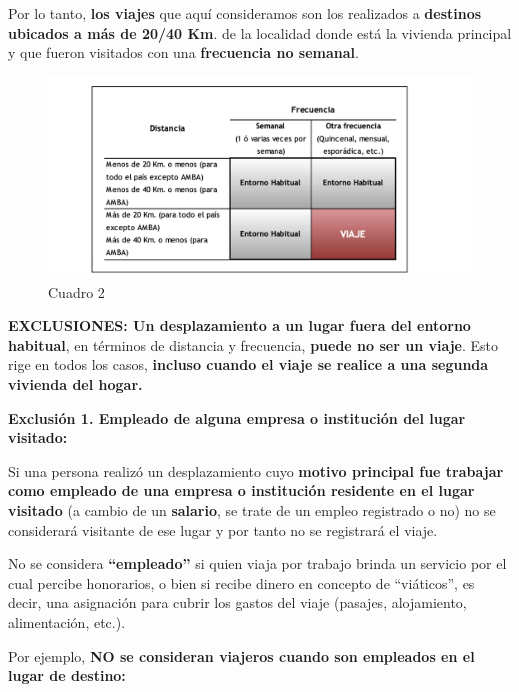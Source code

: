 \documentclass[
  openany]{book}
\begin{document}
Por lo tanto, \textbf{los viajes} que aquí consideramos son los realizados a \textbf{destinos ubicados a más de 20/40 Km}. de la localidad donde está la vivienda principal y que fueron visitados con una \textbf{frecuencia no semanal}.

\begin{figure}

{\centering \includegraphics[width=1\linewidth]{imagenes/figura6-22} 

}

\caption{Cuadro 2}\label{fig:Cuadro}
\end{figure}

\textbf{EXCLUSIONES: Un desplazamiento a un lugar fuera del entorno habitual}, en términos de distancia y frecuencia, \textbf{puede no ser un viaje}. Esto rige en todos los casos, \textbf{incluso cuando el viaje se realice a una segunda vivienda del hogar.}

\textbf{Exclusión 1. Empleado de alguna empresa o institución del lugar visitado:}

Si una persona realizó un desplazamiento cuyo \textbf{motivo principal fue trabajar como empleado de una empresa o institución residente en el lugar visitado} (a cambio de un \textbf{salario}, se trate de un empleo registrado o no) no se considerará visitante de ese lugar y por tanto no se registrará el viaje.

No se considera \textbf{``empleado''} si quien viaja por trabajo brinda un servicio por el cual percibe honorarios, o bien si recibe dinero en concepto de ``viáticos'', es decir, una asignación para cubrir los gastos del viaje (pasajes, alojamiento, alimentación, etc.).

Por ejemplo, \textbf{NO se consideran viajeros cuando son empleados en el lugar de destino:}
\end{document}
